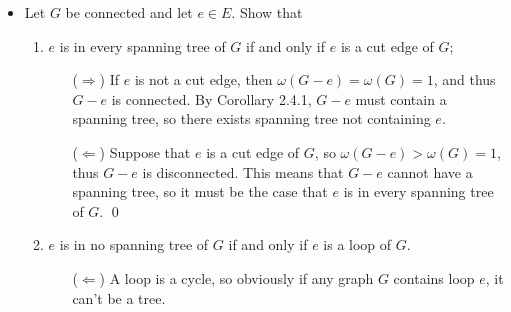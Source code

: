 \documentclass[11pt]{article}
\newcommand\itm[1]{\item[\textbf{#1}]}
\newcommand{\n}{\vspace{0.3cm}}
\begin{document}
\begin{itemize}
\begin{proof}
    \begin{align*}
      2(m+n) - 2 &= 2\nu - 2              & \text{(\(|V_1| + |V_2| = \nu\))}    \\
                 &= 2\varepsilon          & \text{(Theorem 2.2)}                \\
                 &= \sum_{v \in V} d_G(v) & \text{(Theorem 1.1)}                \\
                 &= \sum_{v_1 \in V_1} d_G(v_1) + \sum_{v_2 \in V_2} d_G(v_2)   \\
                 &= 4m + n.               & \text{(\(d_G(C) = 4, d_G(H) = 1\))} \\
    \end{align*}

    Rearranging terms, we get 
    \[2m + 2n - 2 = 4m + n \quad\iff\quad n = 2m + 2.\]
  \end{proof}
  


  \itm{2.2.2} Let \(G\) be connected and let \(e \in E\).  Show that
    \begin{enumerate}[label=(\alph*)]
      \item \(e\) is in every spanning tree of \(G\) if and only if \(e\) is a cut edge of \(G\);
        \begin{enumerate}
          \item[(\(\Rightarrow\))] If \(e\) is not a cut edge, then \(\omega(G-e) = \omega(G) = 1\), and thus \(G-e\) is connected.  By Corollary 2.4.1, \(G-e\) must contain a spanning tree, so there exists spanning tree not containing \(e\). \n

          \item[(\(\Leftarrow\))] Suppose that \(e\) is a cut edge of \(G\), so \(\omega(G-e) > \omega(G) = 1\), thus \(G-e\) is disconnected.  This means that \(G-e\) cannot have a spanning tree, so it must be the case that \(e\) is in every spanning tree of \(G\). \qed \n
        \end{enumerate}

      \item \(e\) is in no spanning tree of \(G\) if and only if \(e\) is a loop of \(G\).
          \begin{enumerate}
            \item[(\(\Leftarrow\))] A loop is a cycle, so obviously if any graph \(G\) contains loop \(e\), it can't be a tree. \n


\end{enumerate}
\end{enumerate}
\end{itemize}
\end{document}
